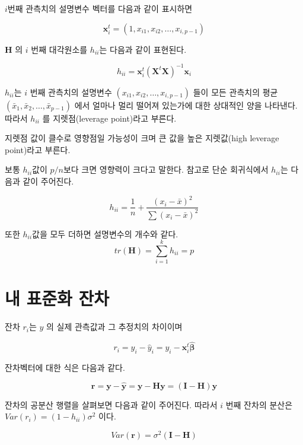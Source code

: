 \documentclass[
  10pt,
]{book}
\theoremstyle{definition}
\theoremstyle{definition}
\theoremstyle{definition}
\theoremstyle{definition}
\theoremstyle{remark}
\begin{document}
\(i\)번째 관측치의 설명변수 벡터를 다음과 같이 표시하면

\[\bm x_{i}^t=(1, x_{i1},x_{i2},\dots, x_{i,p-1}) \]

\(\bm H\) 의 \(i\) 번째 대각원소를 \(h_{ii}\)는 다음과 같이 표현된다.

\begin{equation}
 h_{ii} = \bm x_{i}^t (\bm X^t \bm X)^{-1}  \bm x_{i} 
\label{eq:hii}
\end{equation}

\(h_{ii}\)는 \(i\) 번째 관측치의 설명변수 \((x_{i1},x_{i2},\dots, x_{i,p-1})\)
들이 모든 관측치의 평균 \((\bar x_1, \bar x_2,\dots, \bar x_{p-1})\) 에서
얼마나 멀리 떨어져 있는가에 대한 상대적인 양을 나타낸다. 따라서 \(h_{ii}\)
를 지렛점(leverage point)라고 부른다.

지렛점 값이 클수로 영향점일 가능성이 크며 큰 값을 높은 지렛값(high
leverage point)라고 부른다.

보통 \(h_{ii}\)값이 \(p/n\)보다 크면 영향력이 크다고 말한다. 참고로 단순
회귀식에서 \(h_{ii}\)는 다음과 같이 주어진다.

\[ h_{ii} = \frac{1}{n} + \frac{ ( x_i-\bar x)^2 }{\sum (x_i-\bar x)^2} \]

또한 \(h_{ii}\)값을 모두 더하면 설명변수의 개수와 같다.
\[ tr(\bm H)=\sum_{i=1}^k h_{ii} = p \]

\hypertarget{uxb0b4-uxd45cuxc900uxd654-uxc794uxcc28}{%
\section{내 표준화 잔차}\label{uxb0b4-uxd45cuxc900uxd654-uxc794uxcc28}}

잔차 \(r_i\)는 \(y\) 의 실제 관측값과 그 추정치의 차이이며

\begin{equation}
r_i = y_i -\hat y_i  = y_i - {\bm x}_i^t \hat {\bm \beta}
\label{eq:resid}
\end{equation}

잔차벡터에 대한 식은 다음과 같다.

\begin{equation}
\bm r = \bm y - \hat {\bm y} = \bm y - \bm H \bm y = (\bm I-\bm H)\bm y 
\label{eq:residvec}
\end{equation}

잔차의 공분산 행렬을 살펴보면 다음과 같이 주어진다. 따라서 \(i\) 번째
잔차의 분산은 \(Var(r_i) = (1-h_{ii})\sigma^2\) 이다.

\begin{equation}
Var(\bm r) = \sigma^2 (\bm I-\bm H) 
\label{eq:residvar}
\end{equation}
\end{document}
